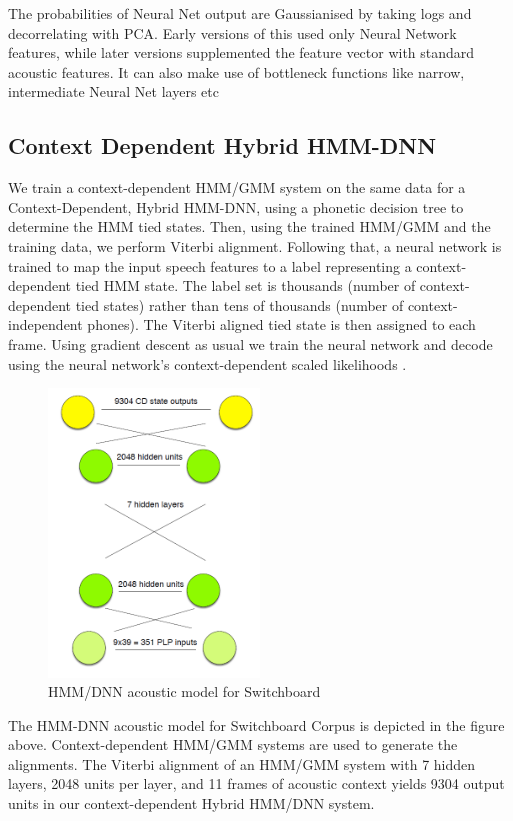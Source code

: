 The probabilities of Neural Net output are Gaussianised by taking logs and decorrelating with PCA. Early versions of this used only Neural Network features, while later versions supplemented the feature vector with standard acoustic features. It can also make use of bottleneck functions like narrow, intermediate Neural Net layers etc

\subsection{Context Dependent Hybrid HMM-DNN}
We train a context-dependent HMM/GMM system on the same data for a Context-Dependent, Hybrid HMM-DNN, using a phonetic decision tree to determine the HMM tied states. Then, using the trained HMM/GMM and the training data, we perform Viterbi alignment. Following that, a neural network is trained to map the input speech features to a label representing a context-dependent tied HMM state. The label set is thousands (number of context-dependent tied states) rather than tens of thousands (number of context-independent phones). The Viterbi aligned tied state is then assigned to each frame. Using gradient descent as usual we  train the neural network and decode using the neural network's context-dependent scaled likelihoods \cite{seide_feature_2011}.

\begin{figure}[h!]
    \centering
    \includegraphics[width=0.5\textwidth]{img/HMMDNN2.png}
    \caption{HMM/DNN acoustic model for Switchboard}
    \label{fig:hmm-dnn-swbd}
\end{figure}

The HMM-DNN acoustic model for Switchboard Corpus\cite{godfrey_switchboard_1992} is depicted in the figure above. Context-dependent HMM/GMM systems are used to generate the alignments. The Viterbi alignment of an HMM/GMM system with 7 hidden layers, 2048 units per layer, and 11 frames of acoustic context yields 9304 output units in our context-dependent Hybrid HMM/DNN system.

